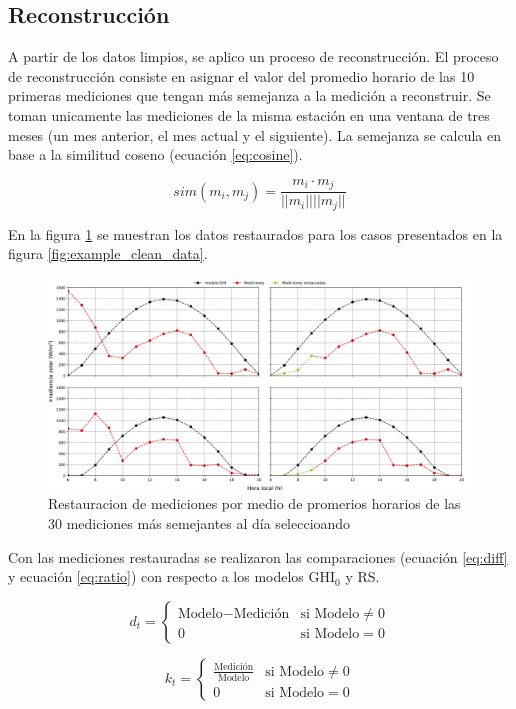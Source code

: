 \subsection{Reconstrucción}

A partir de los datos limpios, se aplico un proceso de reconstrucción. El proceso de reconstrucción consiste en asignar el valor del promedio horario de las 10 primeras mediciones que tengan más semejanza a la medición a reconstruir. Se toman unicamente las mediciones de la misma estación en una ventana de tres meses (un mes anterior, el mes actual y el siguiente). La semejanza se calcula en base a la similitud coseno (ecuación \ref{eq:cosine}).

\begin{equation}
	sim(m_i , m_j ) = \frac{m_i \cdot m_j}{||m_i|| ||m_j||}
	\label{eq:cosine}
\end{equation}

En la figura \ref{fig:restoration} se muestran los datos restaurados para los casos presentados en la figura \ref{fig:example_clean_data}.

\begin{figure}[H]
	\centering
	\includegraphics[width=12cm]{Graphics/example_restoration.png}
	\caption{Restauracion de mediciones por medio de promerios horarios de las 30 mediciones más semejantes al día seleccioando}
	\label{fig:restoration}
\end{figure}

Con las mediciones restauradas se realizaron las comparaciones (ecuación \ref{eq:diff} y ecuación \ref{eq:ratio}) con respecto a los modelos GHI$_0$ y RS.

\begin{equation}
	d_t = \begin{cases}
		\text{Modelo} - \text{Medición} & \text{si Modelo}\neq 0 \\
		0                               & \text{si Modelo} = 0
	\end{cases}
	\label{eq:diff}
\end{equation}

\begin{equation}
	k_t = \begin{cases}
		\frac{\text{Medición}}{\text{Modelo}} & \text{si Modelo}\neq 0 \\
		0                                     & \text{si Modelo} = 0
	\end{cases}
	\label{eq:ratio}
\end{equation}
